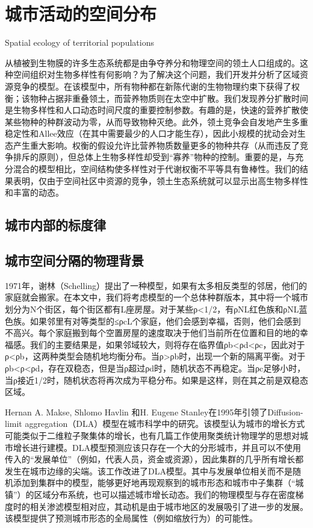 \section{城市活动的空间分布}

Spatial ecology of territorial populations

从植被到生物膜的许多生态系统都是由争夺养分和物理空间的领土人口组成的。这种空间组织对生物多样性有何影响？为了解决这个问题，我们开发并分析了区域资源竞争的模型。在该模型中，所有物种都在新陈代谢的生物物理约束下获得了权衡；该物种占据非重叠领土，而营养物质则在太空中扩散。我们发现养分扩散时间是生物多样性和人口动态时间尺度的重要控制参数。有趣的是，快速的营养扩散使某些物种的种群波动为零，从而导致物种灭绝。此外，领土竞争会自发地产生多重稳定性和Allee效应（在其中需要最少的人口才能生存），因此小规模的扰动会对生态产生重大影响。权衡的假设允许比营养物质数量更多的物种共存（从而违反了竞争排斥的原则），但总体上生物多样性却受到“寡养”物种的控制。重要的是，与充分混合的模型相比，空间结构使多样性对于代谢权衡不平等具有鲁棒性。我们的结果表明，仅由于空间社区中资源的竞争，领土生态系统就可以显示出高生物多样性和丰富的动态。

\subsection{城市内部的标度律}

\subsection{城市空间分隔的物理背景}

1971年，谢林（Schelling）提出了一种模型，如果有太多相反类型的邻居，他们的家庭就会搬家。在本文中，我们将考虑模型的一个总体种群版本，其中将一个城市划分为N个街区，每个街区都有L座房屋。对于某些ρ<1/2，有ρNL红色族和ρNL蓝色族。如果邻里有对等类型的≤ρcL个家庭，他们会感到幸福，否则，他们会感到不高兴。每个家庭搬到每个空置房屋的速度取决于他们当前所在位置和目的地的幸福感。我们的主要结果是，如果邻域较大，则将存在临界值ρb<​​ρd<ρc，因此对于ρ<ρb，这两种类型会随机地均衡分布。当ρ>ρb时，出现一个新的隔离平衡。对于ρb<ρ<ρd，存在双稳态，但是当ρ超过ρd时，随机状态不再稳定。当ρc足够小时，当ρ接近1/2时，随机状态将再次成为平稳分布。如果是这样，则在其之前是双稳态区域。

Hernan A. Makse, Shlomo Havlin 和H. Eugene Stanley在1995年引领了Diffusion-limit aggregation（DLA）模型在城市科学中的研究\cite{MakseModelling}。该模型认为城市的增长方式可能类似于二维粒子聚集体的增长，也有几篇工作\cite{doi:10.1111/j.1538-4632.1991.tb00245.x, BENGUIGUI199513}使用聚类统计物理学的思想对城市增长进行建模。DLA模型预测应该只存在一个大的分形城市，并且可以不使用传入的“发展单位”（例如，代表人员，资金或资源），因此集群的几乎所有增长都发生在城市边缘的尖端。该工作改进了DLA模型。其中与发展单位相关而不是随机添加到集群中的模型，能够更好地再现观察到的城市形态和城市中子集群（“城镇”）的区域分布系统，也可以描述城市增长动态。我们的物理模型与存在密度梯度时的相关渗滤模型相对应，其动机是由于城市地区的发展吸引了进一步的发展。该模型提供了预测城市形态的全局属性（例如缩放行为）的可能性。

